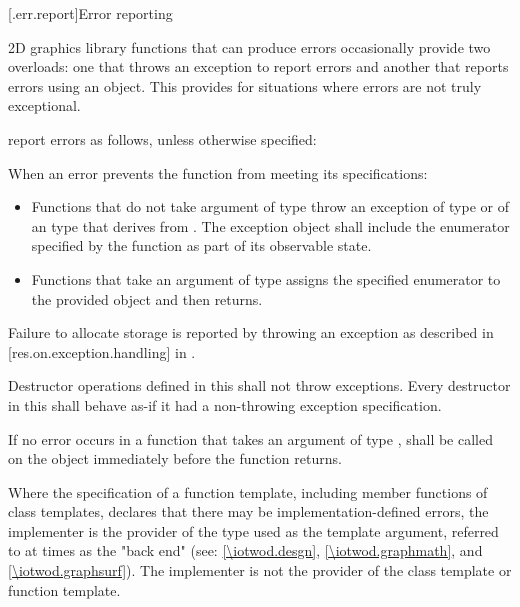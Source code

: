 [\iotwod.err.report]{Error reporting}

\pnum
2D graphics library functions that can produce errors occasionally provide two overloads: one that throws an exception to report errors and another that reports errors using an  object. This provides for situations where errors are not truly exceptional.

\pnum
report errors as follows, unless otherwise specified:

\pnum
When an error prevents the function from meeting its specifications:

\begin{itemize}
\item Functions that do not take argument of type  throw an exception of type  or of an  type that derives from . The exception object shall include the enumerator specified by the function as part of its observable state.

\item Functions that take an argument of type  assigns the specified enumerator to the provided  object and then returns.
\end{itemize}

\pnum
Failure to allocate storage is reported by throwing an exception as described in [res.on.exception.handling] in \CppXVII.

\pnum
Destructor operations defined in this \documenttypename{} shall not throw exceptions. Every destructor in this \documenttypename{} shall behave as-if it had a non-throwing exception specification.

\pnum
If no error occurs in a function that takes an argument of type ,  shall be called on the  object immediately before the function returns.

\pnum
Where the specification of a function template, including member functions of class templates, declares that there may be implementation-defined errors, the implementer is the provider of the type used as the template argument, referred to at times as the "back end" (see: \ref{\iotwod.desgn}, \ref{\iotwod.graphmath}, and \ref{\iotwod.graphsurf}). The implementer is not the provider of the class template or function template.
